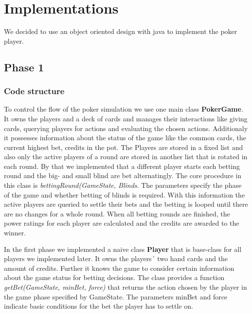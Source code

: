 

\section{Implementations}

We decided to use an object oriented design with java to implement the poker player.

\subsection{Phase 1}

\subsubsection{Code structure}

To control the flow of the poker simulation we use one main class \textbf{PokerGame}.
It owns the players and a deck of cards and manages their interactions like giving cards, querying players for actions and evaluating the chosen actions. Additionaly it possesses information about the status of the game like the common cards, the current highest bet, credits in the pot.
The Players are stored in a fixed list and also only the active players of a round are stored in another list that is rotated in each round. By that we implemented that a different player starts each betting round and the big- and small blind are bet alternatingly. The core procedure in this class is \textit{bettingRound(GameState, Blinds}. The parameters specify the phase of the game and whether betting of blinds is required. With this information the active players are queried to settle their bets and the betting is looped until there are no changes for a whole round. When all betting rounds are finished, the power ratings for each player are calculated and the credits are awarded to the winner.

In the first phase we implemented a naive class \textbf{Player} that is base-class for all players we implemented later. It owns the players´ two hand cards and the amount of credits. Further it knows the game to consider certain information about the game status for betting decisions. The class provides a function \textit{getBet(GameState, minBet, force)} that returns the action chosen by the player in the game phase specified by GameState. The parameters minBet and force indicate basic conditions for the bet the player has to settle on.

